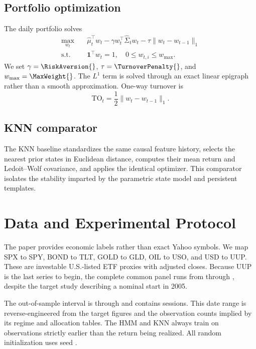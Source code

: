 \documentclass[11pt]{article}
\begin{document}
\subsection{Portfolio optimization}

The daily portfolio solves
\begin{equation}
\begin{aligned}
\max_{w_t}\quad & \widehat\mu_t^\top w_t
 - \gamma w_t^\top\widehat\Sigma_t w_t
 - \tau\|w_t-w_{t-1}\|_1 \\
\text{s.t.}\quad & \mathbf{1}^\top w_t=1,\quad 0\le w_{t,i}\le w_{\max}.
\end{aligned}
\label{eq:mvo}
\end{equation}
We set \(\gamma=\RiskAversion{}\), \(\tau=\TurnoverPenalty{}\), and \(w_{\max}=\MaxWeight{}\). The \(L^1\) term is solved through an exact linear epigraph rather than a smooth approximation. One-way turnover is
\begin{equation}
  \mathrm{TO}_t=\frac{1}{2}\|w_t-w_{t-1}\|_1.
  \label{eq:turnover}
\end{equation}

\subsection{KNN comparator}

The KNN baseline standardizes the same causal feature history, selects the \KNNNeighbors{} nearest prior states in Euclidean distance, computes their mean return and Ledoit--Wolf covariance, and applies the identical optimizer. This comparator isolates the stability imparted by the parametric state model and persistent templates.

\section{Data and Experimental Protocol}

The paper provides economic labels rather than exact Yahoo symbols. We map SPX to SPY, BOND to TLT, GOLD to GLD, OIL to USO, and USD to UUP. These are investable U.S.-listed ETF proxies with adjusted closes. Because UUP is the last series to begin, the complete common panel runs from \PriceStart{} through \PriceEnd{}, despite the target study describing a nominal start in 2005.

The out-of-sample interval is \OOSStart{} through \OOSEnd{} and contains \OOSObs{} sessions. This date range is reverse-engineered from the target figures and the observation counts implied by its regime and allocation tables. The HMM and KNN always train on observations strictly earlier than the return being realized. All random initialization uses seed \RandomSeed{}.
\end{document}
